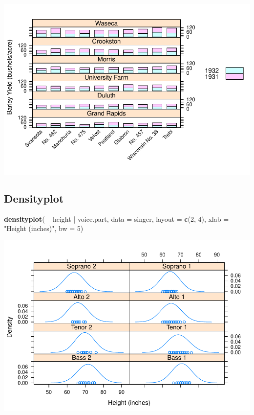 \documentclass[]{article}
\newenvironment{Shaded}{\begin{snugshade}}{\end{snugshade}}
\newcommand{\KeywordTok}[1]{\textcolor[rgb]{0.13,0.29,0.53}{\textbf{{#1}}}}
\newcommand{\DataTypeTok}[1]{\textcolor[rgb]{0.13,0.29,0.53}{{#1}}}
\newcommand{\DecValTok}[1]{\textcolor[rgb]{0.00,0.00,0.81}{{#1}}}
\newcommand{\StringTok}[1]{\textcolor[rgb]{0.31,0.60,0.02}{{#1}}}
\newcommand{\NormalTok}[1]{{#1}}
\begin{document}
\includegraphics{Intro_Datenanalyse1_files/figure-latex/unnamed-chunk-176-1.pdf}

\subsection{Densityplot}\label{densityplot}

\begin{Shaded}
\begin{Highlighting}[]
\KeywordTok{densityplot}\NormalTok{( ~}\StringTok{ }\NormalTok{height |}\StringTok{ }\NormalTok{voice.part, }\DataTypeTok{data =} \NormalTok{singer, }\DataTypeTok{layout =} \KeywordTok{c}\NormalTok{(}\DecValTok{2}\NormalTok{, }\DecValTok{4}\NormalTok{),  }
            \DataTypeTok{xlab =} \StringTok{"Height (inches)"}\NormalTok{, }\DataTypeTok{bw =} \DecValTok{5}\NormalTok{)}
\end{Highlighting}
\end{Shaded}

\includegraphics{Intro_Datenanalyse1_files/figure-latex/unnamed-chunk-177-1.pdf}
\end{document}
